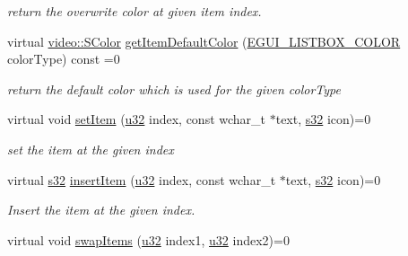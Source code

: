 \begin{DoxyCompactItemize}
\begin{DoxyCompactList}\small\item\em return the overwrite color at given item index. \end{DoxyCompactList}\item 
\mbox{\label{classirr_1_1gui_1_1IGUIListBox_ae755a88721a458b3255df08519b72e85}} 
virtual \hyperlink{classirr_1_1video_1_1SColor}{video\+::\+S\+Color} \hyperlink{classirr_1_1gui_1_1IGUIListBox_ae755a88721a458b3255df08519b72e85}{get\+Item\+Default\+Color} (\hyperlink{namespaceirr_1_1gui_a7da705f0a0b4aa5385e6842adf409cb6}{E\+G\+U\+I\+\_\+\+L\+I\+S\+T\+B\+O\+X\+\_\+\+C\+O\+L\+OR} color\+Type) const =0
\begin{DoxyCompactList}\small\item\em return the default color which is used for the given color\+Type \end{DoxyCompactList}\item 
\mbox{\label{classirr_1_1gui_1_1IGUIListBox_a643ca28110a7de59a378e5ba79b1c37a}} 
virtual void \hyperlink{classirr_1_1gui_1_1IGUIListBox_a643ca28110a7de59a378e5ba79b1c37a}{set\+Item} (\hyperlink{namespaceirr_a0416a53257075833e7002efd0a18e804}{u32} index, const wchar\+\_\+t $\ast$text, \hyperlink{namespaceirr_ac66849b7a6ed16e30ebede579f9b47c6}{s32} icon)=0
\begin{DoxyCompactList}\small\item\em set the item at the given index \end{DoxyCompactList}\item 
virtual \hyperlink{namespaceirr_ac66849b7a6ed16e30ebede579f9b47c6}{s32} \hyperlink{classirr_1_1gui_1_1IGUIListBox_a1da5cc33687efee5ff1e33ab9f0d5b26}{insert\+Item} (\hyperlink{namespaceirr_a0416a53257075833e7002efd0a18e804}{u32} index, const wchar\+\_\+t $\ast$text, \hyperlink{namespaceirr_ac66849b7a6ed16e30ebede579f9b47c6}{s32} icon)=0
\begin{DoxyCompactList}\small\item\em Insert the item at the given index. \end{DoxyCompactList}\item 
\mbox{\label{classirr_1_1gui_1_1IGUIListBox_accb47d6f72558ea5d3034b3e4e4ccd81}} 
virtual void \hyperlink{classirr_1_1gui_1_1IGUIListBox_accb47d6f72558ea5d3034b3e4e4ccd81}{swap\+Items} (\hyperlink{namespaceirr_a0416a53257075833e7002efd0a18e804}{u32} index1, \hyperlink{namespaceirr_a0416a53257075833e7002efd0a18e804}{u32} index2)=0

\end{DoxyCompactItemize}
